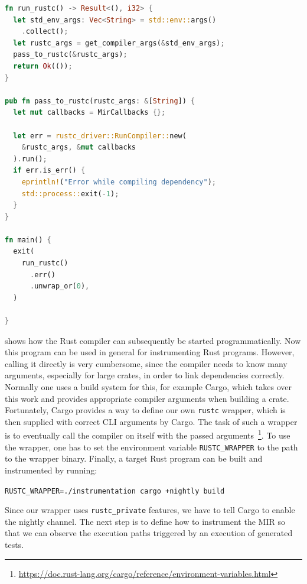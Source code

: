 \documentclass[paper=a4,%
  twoside,%
  BCOR4mm,%
  abstract=true,%
  toc=bibliography,%
  chapterprefix=true,%
  toc=bibliographynumbered,%
  open=right,%
  english,%
  pagesize=pdftex]{scrreprt}
\begin{document}
\begin{lstlisting}[language=Rust, style=boxed, caption={Running the Rust compiler like a library}, label=lst:running-compiler]
fn run_rustc() -> Result<(), i32> {
  let std_env_args: Vec<String> = std::env::args()
    .collect();
  let rustc_args = get_compiler_args(&std_env_args);
  pass_to_rustc(&rustc_args);
  return Ok(());
}

pub fn pass_to_rustc(rustc_args: &[String]) {
  let mut callbacks = MirCallbacks {};

  let err = rustc_driver::RunCompiler::new(
    &rustc_args, &mut callbacks
  ).run();
  if err.is_err() {
    eprintln!("Error while compiling dependency");
    std::process::exit(-1);
  }
}

fn main() {
  exit(
    run_rustc()
      .err()
      .unwrap_or(0),
  )

}
\end{lstlisting}

 shows how the Rust compiler can subsequently be started programmatically. Now this program can be used in general for instrumenting Rust programs. However, calling it directly is very cumbersome, since the compiler needs to know many arguments, especially for large crates, in order to link dependencies correctly. Normally one uses a build system for this, for example Cargo, which takes over this work and provides appropriate compiler arguments when building a crate. Fortunately, Cargo provides a way to define our own \lstinline{rustc} wrapper, which is then supplied with correct CLI arguments by Cargo. The task of such a wrapper is to eventually call the compiler on itself with the passed arguments~\footnote{\url{https://doc.rust-lang.org/cargo/reference/environment-variables.html}}. To use the wrapper, one has to set the environment variable \lstinline{RUSTC_WRAPPER} to the path to the wrapper binary. Finally, a target Rust program can be built and instrumented by running:

\lstinline{RUSTC_WRAPPER=./instrumentation cargo +nightly build}

Since our wrapper uses \lstinline{rustc_private} features, we have to tell Cargo to enable the nightly channel. The next step is to define how to instrument the \ac{MIR} so that we can observe the execution paths triggered by an execution of generated tests.

\end{document}
